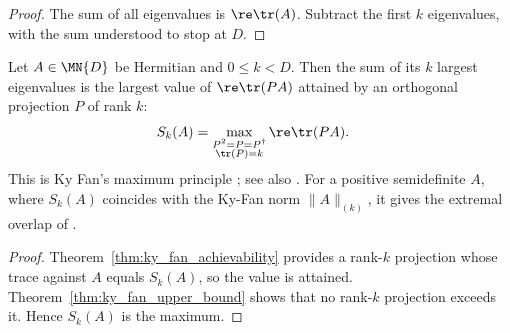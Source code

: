 \begin{proof}\leanok
    The sum of all eigenvalues is $\re\tr(A)$. Subtract the first $k$
    eigenvalues, with the sum understood to stop at $D$.
\end{proof}

\begin{theorem}
    \label{thm:ky_fan_maximum_principle}
    \leanok
    Let $A\in\MN{D}$ be Hermitian and $0\le k<D$. Then the sum of its $k$
    largest eigenvalues is the largest value of $\re\tr(PA)$ attained by an
    orthogonal projection $P$ of rank $k$:
    \begin{align}
        S_k(A)
         & =\max_{\substack{P^2=P=P^\dagger \\ \tr(P)=k}}\re\tr(PA).
        \label{eq:channel_ky_fan_maximum}
    \end{align}
    This is Ky Fan's maximum principle \cite{Fan1949Theorem}; see also
    \cite[Problem~I.6.15, Exercise~II.1.13]{Bhatia1997Matrix}. For a positive
    semidefinite $A$, where $S_k(A)$ coincides with the Ky-Fan norm
    $\|A\|_{(k)}$, it gives the extremal overlap of
    \cite[Lemma~3.1]{Wolf2012Quantum}.
\end{theorem}

\begin{proof}\leanok
    Theorem~\ref{thm:ky_fan_achievability} provides a rank-$k$ projection
    whose trace against $A$ equals $S_k(A)$, so the value is attained.
    Theorem~\ref{thm:ky_fan_upper_bound} shows that no rank-$k$ projection
    exceeds it. Hence $S_k(A)$ is the maximum.
\end{proof}


